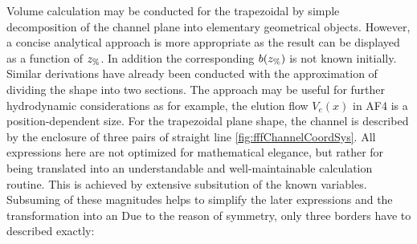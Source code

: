 Volume calculation may be conducted for the trapezoidal by simple decomposition of the channel plane into elementary 
geometrical objects. However, a concise analytical approach is more appropriate as the result can be displayed as a 
function of $z_\text{\%}$. In addition the corresponding $b(z_\text{\%})$ is not known initially. Similar derivations have already been 
conducted with the approximation of dividing the shape into two sections.
The approach may be useful for further hydrodynamic considerations as for example, the elution flow $V_e(x)$ in AF4 is 
a position-dependent size. For the trapezoidal plane shape, the channel is described by the enclosure of three pairs of 
straight line \ref{fig:fffChannelCoordSys}. All expressions here are not optimized for mathematical elegance, but 
rather for being translated into an understandable and well-maintainable calculation routine. This is achieved by 
extensive subsitution of the known variables. Subsuming of these magnitudes helps to simplify the later expressions 
and the transformation into an 
Due to the reason of symmetry, only three borders have to described exactly:

